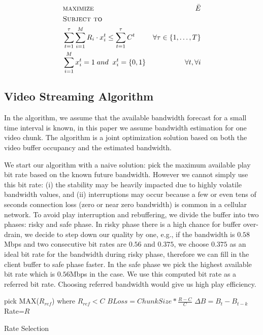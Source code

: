 \begin{subequations}
\begin{align*}
&\textsc{maximize }&\bar{E}\\ 
&\textsc{Subject to}\\
&\sum \limits_{t=1}^\tau  \sum \limits_{i=1}^M R_i \cdot x_i^t\leq\sum\limits_{t=1}^\tau C^t& \forall \tau \in \{1, \dots, T\}\\
&\sum \limits_{i=1}^M x_i^t =1\; and\;\; x_i^t = \{0,1\}&\forall t, \forall i
\end{align*}
\end{subequations}

\subsection{Video Streaming Algorithm} \label{subsec:online}

In the algorithm, we assume that the available bandwidth forecast for a small time interval is known, in this paper we assume bandwidth estimation for one video chunk. The algorithm is a joint optimization solution based on both the video buffer occupancy and the estimated bandwidth. 

We start our algorithm with a naive solution: pick the maximum available play bit rate based on the known future bandwidth. However we cannot simply use this bit rate: (i) the stability may be heavily impacted due to highly volatile bandwidth values, and (ii) interruptions may occur because a few or even tens of seconds connection loss (zero or near zero bandwidth) is common in a cellular network. To avoid play interruption and rebuffering, we divide the buffer into two phases: risky and safe phase. In risky phase there is a high chance for buffer over-drain, we decide to step down our quality by one, e.g., if the bandwidth is $0.58$Mbps and two consecutive bit rates are $0.56$ and $0.375$, we choose $ 0.375$ as an ideal bit rate for the bandwidth during risky phase, therefore we can fill in the client buffer to safe phase faster. In the safe phase we pick the highest available bit rate which is $0.56$Mbps in the case. We use this computed bit rate as a referred bit rate. Choosing referred bandwidth would give us high play efficiency. 

\begin{algorithm} [t]
\SetAlgoLined
pick MAX($R_{ref}$) where $R_{ref}<C$\;
 {
 {
 $BLoss=ChunkSize*\frac{R-C}{C}$\;
 $\Delta B = B_{t} -B_{t-k} $\;
 {Rate=$R$}
 }
 }
\caption{Rate Selection} \label{cap:algorithm}
\end{algorithm} 

